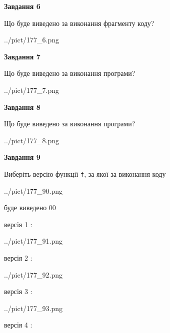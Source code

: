\documentclass[12pt, ukrainian]{article}
\def\code#1{\Verb!#1!}
\begin{document}
{\begin {large}
{\begin {center}\textbf{Завдання 6}\end {center}}

Що буде виведено за виконання фрагменту коду?\par
\begin{center}
	{../pict/177_6.png}
\end{center}
\newpage

{\begin {center}\textbf{Завдання 7}\end {center}}

Що буде виведено за виконання програми?\par
\begin{center}
	{../pict/177_7.png}
\end{center}
\newpage

{\begin {center}\textbf{Завдання 8}\end {center}}

Що буде виведено за виконання програми?\par
\begin{center}
	{../pict/177_8.png}
\end{center}
\newpage

{\begin {center}\textbf{Завдання 9}\end {center}}

Виберіть версію функції \code{f}, за якої за виконання коду
\begin{center}
	{../pict/177_90.png}
\end{center}
буде виведено 00

\vspace{5mm}
версія 1 :

\begin{center}
	{../pict/177_91.png}
\end{center}
версія 2 :

\begin{center}
	{../pict/177_92.png}
\end{center}
версія 3 :

\begin{center}
	{../pict/177_93.png}
\end{center}
версія 4 :


\end{large}}
\end{document}
